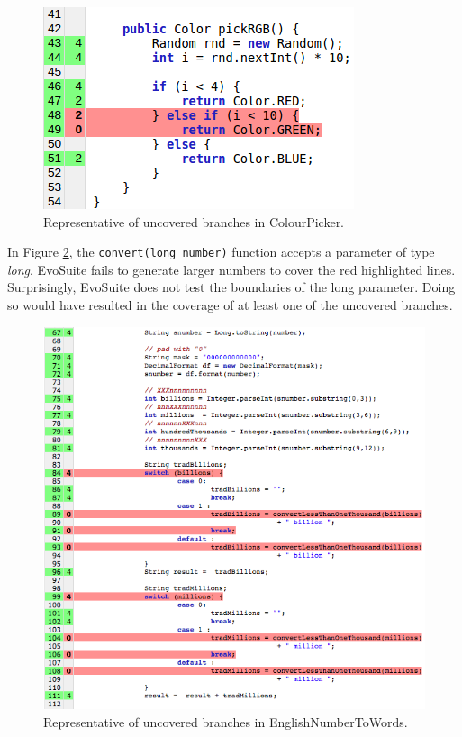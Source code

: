 \begin{figure}
\centering
\begin{minipage}[c]{\textwidth}
        \includegraphics[width=.4\textwidth]{CoverageAnalysis/ColourPicker.png}
    \caption{Representative of uncovered branches in ColourPicker.}
    \label{fig:ColourPickerAnalysis}
    \vspace{.5cm}
\end{minipage}
\end{figure}

In Figure \ref{fig:EnglishNumberToWordsAnalysis}, the \verb|convert(long number)| function accepts a parameter of type \emph{long}.
EvoSuite fails to generate larger numbers to cover the red highlighted lines.
Surprisingly, EvoSuite does not test the boundaries of the long parameter.
Doing so would have resulted in the coverage of at least one of the uncovered branches.

\begin{figure}
\centering
\begin{minipage}[c]{\textwidth}
        \includegraphics[width=.65\textwidth]{CoverageAnalysis/EnglishNumberToWords.png}
    \caption{Representative of uncovered branches in EnglishNumberToWords.}
    \label{fig:EnglishNumberToWordsAnalysis}
    \vspace{.5cm}
\end{minipage}
\end{figure}


